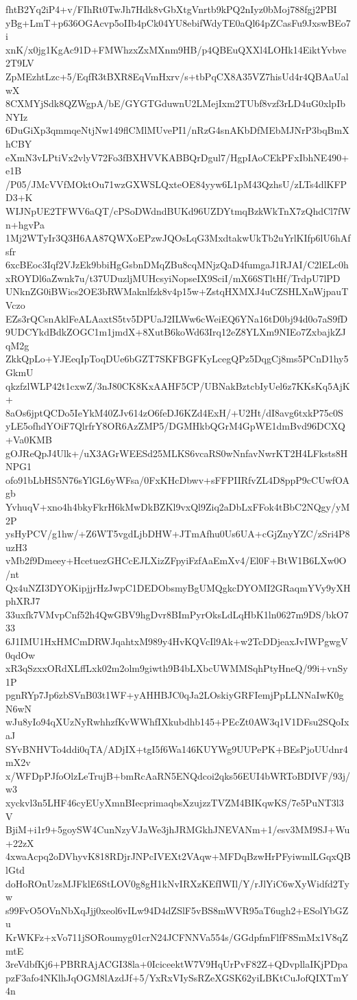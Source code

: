 fhtB2Yq2iP4+v/FIhRt0TwJh7Hdk8vGbXtgVnrtb9kPQ2nIyz0bMoj788fgj2PBI
yBg+LmT+p636OGAcvp5oIIb4pCk04YU8ebifWdyTE0aQl64pZCasFu9JxswBEo7i
xnK/x0jg1KgAc91D+FMWhzxZxMXnm9HB/p4QBEuQXXl4LOHk14EiktYvbve2T9LV
ZpMEzhtLzc+5/EqfR3tBXR8EqVmHxrv/s+tbPqCX8A35VZ7hisUd4r4QBAaUalwX
8CXMYjSdk8QZWgpA/bE/GYGTGduwnU2LMejIxm2TUbf8vzf3rLD4uG0xlpIbNYIz
6DuGiXp3qmmqeNtjNw149flCMlMUvePI1/nRzG4snAKbDfMEbMJNrP3bqBmXhCBY
eXmN3vLPtiVx2vlyV72Fo3fBXHVVKABBQrDgul7/HgpIAoCEkPFxIbhNE490+e1B
/P05/JMcVVfMOktOu71wzGXWSLQxteOE84yyw6L1pM43QzhsU/zLTs4dlKFPD3+K
WIJNpUE2TFWV6aQT/cPSoDWdndBUKd96UZDYtmqBzkWkTnX7zQhdCl7fWn+hgvPa
1Mj2WTyIr3Q3H6AA87QWXoEPzwJQOsLqG3MxdtakwUkTb2uYrlKIfp6lU6hAfsfr
6xcBEoc3Iqf2VJzEk9bbiHgGsbnDMqZBu8cqMNjzQaD4fumgaJ1RJAI/C2lELc0h
xROYDl6aZwnk7u/t37UDuzljMUHcsyiNopseIX9SciI/mX66STltHf/TrdpU7lPD
UNknZG0iBWics2OE3bRWMaknlfzk8v4p15w+ZstqHXMXJ4uCZSHLXnWjpauTVczo
EZs3rQCsnAklFeALAaxtS5tv5DPUaJ2ILWw6cWeiEQ6YNa16tD0bj94d0o7aS9fD
9UDCYkdBdkZOGC1m1jmdX+8XutB6koWd63Irq12eZ8YLXm9NIEo7ZxbajkZJqM2g
ZkkQpLo+YJEeqIpToqDUe6bGZT7SKFBGFKyLcegQPz5DqgCj8ms5PCnD1hy5GkmU
qkzfzlWLP42t1cxwZ/3nJ80CK8KxAAHF5CP/UBNakBztcbIyUel6z7KKsKq5AjK+
8aOs6jptQCDo5IeYkM40ZJv614zO6feDJ6KZd4ExH/+U2Ht/dI8avg6txkP75c0S
yLE5ofhdYOiF7QlrfrY8OR6AzZMP5/DGMHkbQGrM4GpWE1dmBvd96DCXQ+Va0KMB
gOJReQpJ4Ulk+/uX3AGrWEESd25MLKS6vcaRS0wNnfavNwrKT2H4LFksts8HNPG1
ofo91bLbHS5N76sYlGL6yWFsa/0FxKHcDbwv+sFFPIIRfvZL4D8ppP9cCUwfOAgb
YvhuqV+xno4h4bkyFkrH6kMwDkBZKl9vxQl9Ziq2aDbLxFFok4tBbC2NQgy/yM2P
ysHyPCV/g1hw/+Z6WT5vgdLjbDHW+JTmAfhu0Us6UA+cGjZnyYZC/zSri4P8uzH3
vMb2f9Dmeey+HcetuezGHCcEJLXizZFpyiFzfAaEmXv4/El0F+BtW1B6LXw0O/nt
Qx4uNZI3DYOKipjjrHzJwpC1DEDObsmyBgUMQgkcDYOMI2GRaqmYVy9yXHphXRJ7
33uxfk7VMvpCnf52h4QwGBV9hgDvr8BImPyrOksLdLqHbK1ln0627m9DS/bkO733
6J1IMU1HxHMCmDRWJqahtxM989y4HvKQVcIl9Ak+w2TcDDjeaxJvIWPgwgV0qdOw
xR3qSzxxORdXLffLxk02m2olm9giwth9B4bLXbcUWMMSqhPtyHneQ/99i+vnSy1P
pgnRYp7Jp6zbSVnB03t1WF+yAHHBJC0qJa2LOskiyGRFIemjPpLLNNaIwK0gN6wN
wJu8yIo94qXUzNyRwhhzfKvWWhfIXkubdhb145+PEcZt0AW3q1V1DFsu2SQoIxaJ
SYvBNHVTo4ddi0qTA/ADjIX+tgI5f6Wa146KUYWg9UUPePK+BEsPjoUUdnr4mX2v
x/WFDpPJfoOlzLeTrujB+bmRcAaRN5ENQdcoi2qks56EUI4bWRToBDIVF/93j/w3
xyckvl3n5LHF46cyEUyXmnBIecprimaqbsXzujzzTVZM4BIKqwKS/7e5PuNT3l3V
BjiM+i1r9+5goySW4CunNzyVJaWe3jhJRMGkhJNEVANm+1/esv3MM9SJ+Wu+22zX
4xwaAcpq2oDVhyvK818RDjrJNPcIVEXt2VAqw+MFDqBzwHrPFyiwmlLGqxQBlGtd
doHoROnUzsMJFklE6StLOV0g8gH1kNvIRXzKEfIWIl/Y/rJlYiC6wXyWidfd2Tyw
s99FvO5OVnNbXqJjj0xeol6vILw94D4dZSlF5vBS8mWVR95aT6ugh2+ESolYbGZu
KrWKFz+xVo711jSORoumyg01crN24JCFNNVa554s/GGdpfmFlfF8SmMx1V8qZmtE
3reVdbfKj6+PBRRAjACGI38la+0IciceektW7V9HqUrPvF82Z+QDvpllaIKjPDpa
pzF3afo4NKlhJqOGM8lAzdJf+5/YxRxVIySsRZeXGSK62yiLBKtCuJofQIXTmY4n
